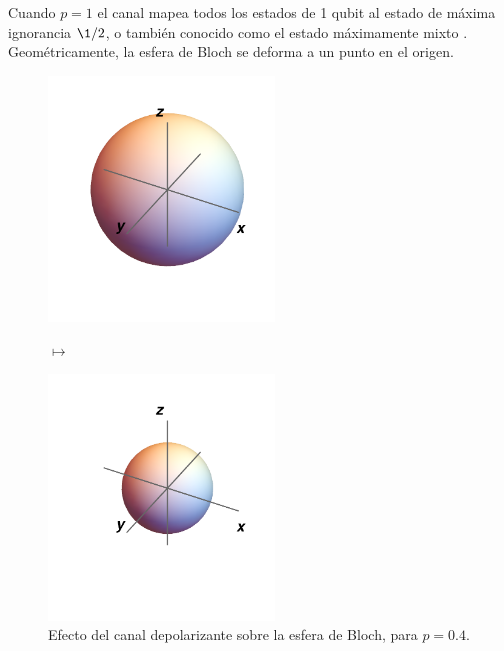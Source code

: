 Cuando $p=1$ el canal mapea todos los estados 
de 1 qubit al estado de máxima ignorancia $\1/2$, 
o también conocido como el estado máximamente mixto 
\cite{bengtsson_zyczkowski_2017}. Geométricamente, 
la esfera de Bloch se deforma a un punto en el origen.
\begin{figure}
    \centering
    \begin{minipage}{.4\textwidth}
        \centering
        \includegraphics[width=6cm]{images/bloch-ball}
    \end{minipage}
    $\longmapsto$
    \begin{minipage}{0.4\textwidth}
        \centering
        \includegraphics[width=6cm]{images/depolarizing}
    \end{minipage}
    \caption{Efecto del canal depolarizante sobre la esfera de Bloch, 
    para $p=0.4$.}
    \label{fig:depolarizing}
\end{figure}


